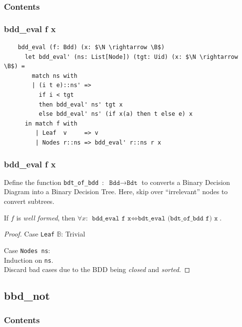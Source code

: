 \documentclass[english, aspectratio=169]{beamer}
\newcommand{\B}[0]{\ensuremath{\mathbb{B}}}
\begin{document}
\begin{frame}{}
  \frametitle{Contents}
\end{frame}

\begin{frame}[fragile]
  \frametitle{bdd\_eval f x}

  \begin{lstlisting}
    bdd_eval (f: Bdd) (x: $\N \rightarrow \B$)
      let bdd_eval' (ns: List[Node]) (tgt: Uid) (x: $\N \rightarrow \B$) =
        match ns with
        | (i t e)::ns' =>
          if i < tgt
          then bdd_eval' ns' tgt x
          else bdd_eval' ns' (if x(a) then t else e) x
      in match f with
         | Leaf  v     => v
         | Nodes r::ns => bdd_eval' r::ns r x
  \end{lstlisting}
\end{frame}

\begin{frame}
  \frametitle{bdd\_eval f x}

  Define the function \texttt{bdt\_of\_bdd}~:~$\texttt{Bdd} \rightarrow \texttt{Bdt}$ to converts a
  Binary Decision Diagram into a Binary Decision Tree. Here, skip over ``irrelevant'' nodes to
  convert subtrees.

  \pause

  \begin{theorem}
    If $f$ is \emph{well formed}, then $\forall x$:
    $\texttt{bdd\_eval f x} \iff \texttt{bdt\_eval (bdt\_of\_bdd f) x}$.
  \end{theorem}
  \begin{proof}
    Case \texttt{Leaf} $\B$: Trivial

    Case \texttt{Nodes ns}:\\
    \quad Induction on \texttt{ns}.\\
    \quad Discard bad cases due to the BDD being \emph{closed} and \emph{sorted}.
  \end{proof}
\end{frame}

\subsection{bbd\_not}

\begin{frame}{}
  \frametitle{Contents}
\end{frame}
\end{document}
